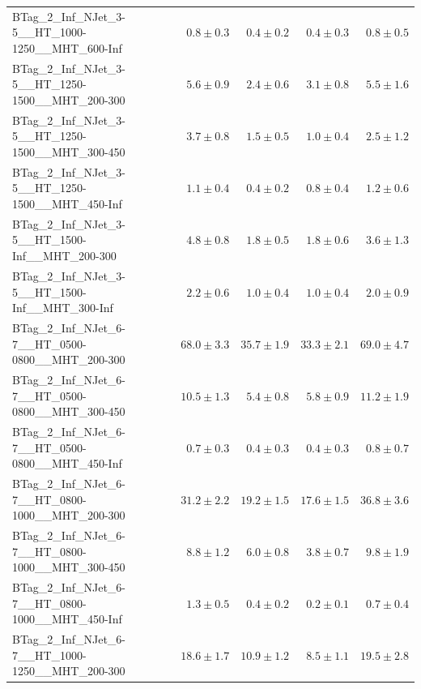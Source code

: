 \documentclass{beamer}
\begin{document}
\begin{frame}
\begin{tabular}{lrrrr}
 BTag\_2\_Inf\_NJet\_3-5\_\_HT\_1000-1250\_\_MHT\_600-Inf &               $0.8\pm0.3$&               $0.4\pm0.2$&               $0.4\pm0.3$&                   $0.8\pm0.5$ \\ 
 BTag\_2\_Inf\_NJet\_3-5\_\_HT\_1250-1500\_\_MHT\_200-300 &               $5.6\pm0.9$&               $2.4\pm0.6$&               $3.1\pm0.8$&                   $5.5\pm1.6$ \\ 
 BTag\_2\_Inf\_NJet\_3-5\_\_HT\_1250-1500\_\_MHT\_300-450 &               $3.7\pm0.8$&               $1.5\pm0.5$&               $1.0\pm0.4$&                   $2.5\pm1.2$ \\ 
 BTag\_2\_Inf\_NJet\_3-5\_\_HT\_1250-1500\_\_MHT\_450-Inf &               $1.1\pm0.4$&               $0.4\pm0.2$&               $0.8\pm0.4$&                   $1.2\pm0.6$ \\ 
  BTag\_2\_Inf\_NJet\_3-5\_\_HT\_1500-Inf\_\_MHT\_200-300 &               $4.8\pm0.8$&               $1.8\pm0.5$&               $1.8\pm0.6$&                   $3.6\pm1.3$ \\ 
  BTag\_2\_Inf\_NJet\_3-5\_\_HT\_1500-Inf\_\_MHT\_300-Inf &               $2.2\pm0.6$&               $1.0\pm0.4$&               $1.0\pm0.4$&                   $2.0\pm0.9$ \\ 
 BTag\_2\_Inf\_NJet\_6-7\_\_HT\_0500-0800\_\_MHT\_200-300 &              $68.0\pm3.3$&              $35.7\pm1.9$&              $33.3\pm2.1$&                  $69.0\pm4.7$ \\ 
 BTag\_2\_Inf\_NJet\_6-7\_\_HT\_0500-0800\_\_MHT\_300-450 &              $10.5\pm1.3$&               $5.4\pm0.8$&               $5.8\pm0.9$&                  $11.2\pm1.9$ \\ 
 BTag\_2\_Inf\_NJet\_6-7\_\_HT\_0500-0800\_\_MHT\_450-Inf &               $0.7\pm0.3$&               $0.4\pm0.3$&               $0.4\pm0.3$&                   $0.8\pm0.7$ \\ 
 BTag\_2\_Inf\_NJet\_6-7\_\_HT\_0800-1000\_\_MHT\_200-300 &              $31.2\pm2.2$&              $19.2\pm1.5$&              $17.6\pm1.5$&                  $36.8\pm3.6$ \\ 
 BTag\_2\_Inf\_NJet\_6-7\_\_HT\_0800-1000\_\_MHT\_300-450 &               $8.8\pm1.2$&               $6.0\pm0.8$&               $3.8\pm0.7$&                   $9.8\pm1.9$ \\ 
 BTag\_2\_Inf\_NJet\_6-7\_\_HT\_0800-1000\_\_MHT\_450-Inf &               $1.3\pm0.5$&               $0.4\pm0.2$&               $0.2\pm0.1$&                   $0.7\pm0.4$ \\ 
 BTag\_2\_Inf\_NJet\_6-7\_\_HT\_1000-1250\_\_MHT\_200-300 &              $18.6\pm1.7$&              $10.9\pm1.2$&               $8.5\pm1.1$&                  $19.5\pm2.8$ \\ 

\end{tabular}
\end{frame}
\end{document}
